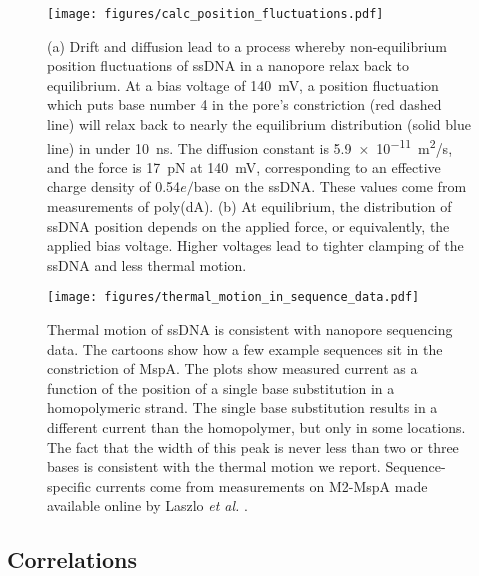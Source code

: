 \begin{figure}[h]
\begin{centering}
\texttt{[image: figures/calc\_position\_fluctuations.pdf]}
\caption[Position fluctuations of ssDNA in MspA]{(a) Drift and diffusion lead to a process whereby non-equilibrium position fluctuations of ssDNA in a nanopore relax back to equilibrium.  At a bias voltage of \SI{140}{\mV}, a position fluctuation which puts base number 4 in the pore's constriction (red dashed line) will relax back to nearly the equilibrium distribution (solid blue line) in under \SI{10}{\ns}.  The diffusion constant is \SI{5.9e-11}{\m^2/s}, and the force is \SI{17}{\pico\N} at \SI{140}{\mV}, corresponding to an effective charge density of \num{0.54}$e/\text{base}$ on the ssDNA.  These values come from measurements of poly(dA).  (b) At equilibrium, the distribution of ssDNA position depends on the applied force, or equivalently, the applied bias voltage.  Higher voltages lead to tighter clamping of the ssDNA and less thermal motion.}
\label{fig:position_fluctuations}
\end{centering}
\end{figure}

\begin{figure}[h]
\begin{centering}
\texttt{[image: figures/thermal\_motion\_in\_sequence\_data.pdf]}
\caption[Thermal motion averaging and sequencing data]{Thermal motion of ssDNA is consistent with nanopore sequencing data.  The cartoons show how a few example sequences sit in the constriction of MspA.  The plots show measured current as a function of the position of a single base substitution in a homopolymeric strand.  The single base substitution results in a different current than the homopolymer, but only in some locations.  The fact that the width of this peak is never less than two or three bases is consistent with the thermal motion we report.  Sequence-specific currents come from measurements on M2-MspA made available online by Laszlo \textit{et al.} \citep{Laszlo2014}.}
\label{fig:thermal_motion_sequencing}
\end{centering}
\end{figure}

\subsection{Correlations}

